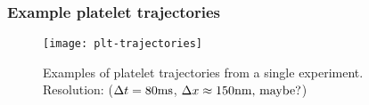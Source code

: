 \documentclass{beamer}
\newcommand{\tn}{\textnormal}
\begin{document}
\begin{frame}
  \frametitle{Example platelet trajectories}
  \begin{figure}
    \centering \texttt{[image: plt-trajectories]}
    \caption{Examples of platelet trajectories from a single
      experiment. Resolution: ($\Delta t = 80 \tn{ms}$, $\Delta x
      \approx 150\tn{nm} \tn{, maybe?}$)}
    \label{fig:plt-trajectory}
  \end{figure}
\end{frame}


%         

\end{document}
